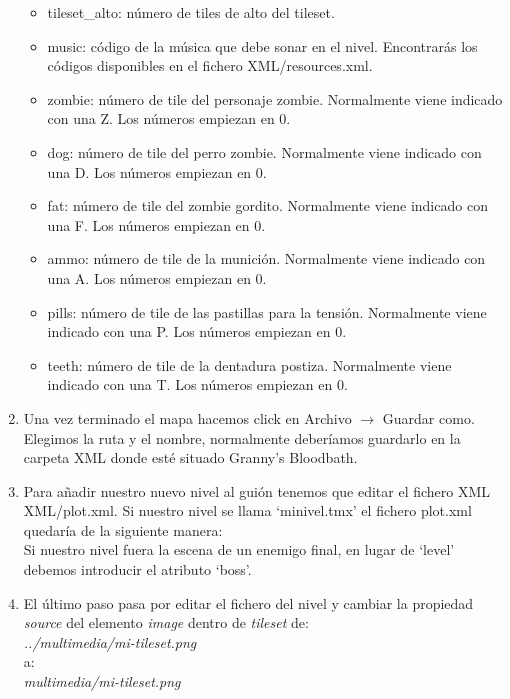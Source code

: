 \begin{enumerate}
\begin{itemize}
		\item tileset\_alto: número de tiles de alto del tileset.
		\item music: código de la música que debe sonar en el nivel.
		Encontrarás los códigos disponibles en el fichero
		XML/resources.xml.
		\item zombie: número de tile del personaje zombie. Normalmente
		viene indicado con una Z. Los números empiezan en 0.
		\item dog: número de tile del perro zombie. Normalmente
		viene indicado con una D. Los números empiezan en 0.
		\item fat: número de tile del zombie gordito. Normalmente
		viene indicado con una F. Los números empiezan en 0.
		\item ammo: número de tile de la munición. Normalmente
		viene indicado con una A. Los números empiezan en 0.
		\item pills: número de tile de las pastillas para la tensión. Normalmente
		viene indicado con una P. Los números empiezan en 0.
		\item teeth: número de tile de la dentadura postiza. Normalmente
		viene indicado con una T. Los números empiezan en 0.
	\end{itemize}
	\item Una vez terminado el mapa hacemos click en Archivo $\rightarrow$
	Guardar como. Elegimos la ruta y el nombre, normalmente deberíamos guardarlo
	en la carpeta XML donde esté situado Granny's Bloodbath.
	\item Para añadir nuestro nuevo nivel al guión tenemos que editar el fichero XML
	XML/plot.xml. Si nuestro nivel se llama `minivel.tmx' el fichero plot.xml
	quedaría de la siguiente manera:\\
	
	
	
	Si nuestro nivel fuera la escena de un enemigo final, en lugar de `level'
	debemos introducir el atributo `boss'.
	
	\item El último paso pasa por editar el fichero del nivel y cambiar la propiedad
	\emph{source} del elemento \emph{image} dentro de \emph{tileset} de:\\
	
	\emph{../multimedia/mi-tileset.png}\\
	
	a:\\
	
	\emph{multimedia/mi-tileset.png}
\end{enumerate}

